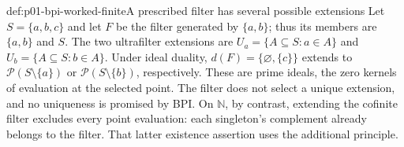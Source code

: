 \begin{hbexample}{def:p01-bpi-worked-finite}{A prescribed filter has several possible extensions}
Let \(S=\{a,b,c\}\) and let \(F\) be the filter generated by
\(\{a,b\}\); thus its members are \(\{a,b\}\) and \(S\).
The two ultrafilter extensions are
\(U_a=\{A\subseteq S:a\in A\}\) and
\(U_b=\{A\subseteq S:b\in A\}\).
Under ideal duality, \(d(F)=\{\varnothing,\{c\}\}\) extends to
\(\mathcal P(S\setminus\{a\})\) or
\(\mathcal P(S\setminus\{b\})\), respectively. These are prime
ideals, the zero kernels of evaluation at the selected point. The filter
does not select a unique extension, and no uniqueness is promised by BPI.
On \(\mathbb N\), by contrast, extending the cofinite filter excludes
every point evaluation: each singleton's complement already belongs to the
filter. That latter existence assertion uses the additional principle.
\end{hbexample}
